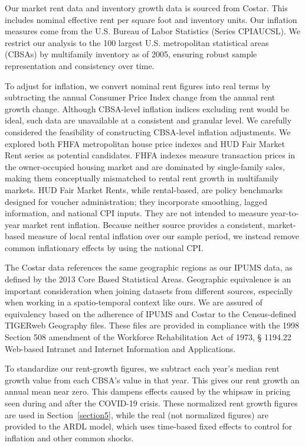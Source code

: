 \documentclass[pdflatex,sn-apa]{sn-jnl}%
\theoremstyle{thmstyleone}%
\theoremstyle{thmstyletwo}%
\theoremstyle{thmstylethree}%
\begin{document}
Our market rent data and inventory growth data is sourced from Costar. This includes nominal effective rent per square foot and inventory units. Our inflation measures come from the U.S. Bureau of Labor Statistics (Series CPIAUCSL). We restrict our analysis to the 100 largest U.S. metropolitan statistical areas (CBSAs) by multifamily inventory as of 2005, ensuring robust sample representation and consistency over time.

To adjust for inflation, we convert nominal rent figures into real terms by subtracting the annual Consumer Price Index change from the annual rent growth change. Although CBSA-level inflation indices excluding rent would be ideal, such data are unavailable at a consistent and granular level. We carefully considered the feasibility of constructing CBSA-level inflation adjustments. We explored both FHFA metropolitan house price indexes and HUD Fair Market Rent series as potential candidates. FHFA indexes measure transaction prices in the owner-occupied housing market and are dominated by single-family sales, making them conceptually mismatched to rental rent growth in multifamily markets. HUD Fair Market Rents, while rental-based, are policy benchmarks designed for voucher administration; they incorporate smoothing, lagged information, and national CPI inputs. They are not intended to measure year-to-year market rent inflation. Because neither source provides a consistent, market-based measure of local rental inflation over our sample period, we instead remove common inflationary effects by using the national CPI.

The Costar data references the same geographic regions as our IPUMS data, as defined by the 2013 Core Based Statistical Areas. Geographic equivalence is an important consideration when joining datasets from different sources, especially when working in a spatio-temporal context like ours. We are assured of equivalency based on the adherence of IPUMS and Costar to the Census-defined TIGERweb Geography files. These files are provided in compliance with the 1998 Section 508 amendment of the Workforce Rehabilitation Act of 1973, § 1194.22 Web-based Intranet and Internet Information and Applications.

To standardize our rent-growth figures, we subtract each year's median rent growth value from each CBSA's value in that year. This gives our rent growth an annual mean near zero. This dampens effects caused by the whipsaw in pricing seen during and after the COVID-19 crisis. These normalized rent growth figures are used in Section~\ref{section5}, while the real (not normalized figures) are provided to the ARDL model, which uses time-based fixed effects to control for inflation and other common shocks. 
\end{document}

